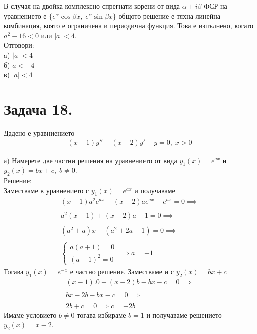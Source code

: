 \documentclass[a4paper, 12pt, oneside]{article}
\begin{document}
В случая на двойка комплексно спрегнати корени от вида $\alpha \pm i \beta$
ФСР на уравнението е $\{e^\alpha\cos \beta x, \; e^\alpha\sin \beta x\}$ общото решение
е тяхна линейна комбинация, която е ограничена и периодична функция.
Това е изпълнено, когато $a^2 - 16 < 0$ или $|a| < 4$. \\

Отговори: \\

a) $|a| < 4$ \\

б) $a < -4$ \\

в) $|a| < 4$

\section{Задача 18.}
Дадено е уравниението
\begin{align*}
    (x - 1)y'' + (x - 2)y' - y = 0, \; x > 0
\end{align*}

а) Намерете две частни решения на уравнението от вида $y_1(x) = e^{ax}$
и $y_2(x) = bx + c, \; b \neq 0$. \\

Решение: \\

Заместваме в уравнението с $y_1(x) = e^{ax}$ и получаваме
\begin{align*}
    (x - 1)a^2e^{ax} + (x - 2)ae^{ax} - e^{ax} = 0 \implies \\\\
   a^2(x - 1) + (x - 2)a - 1 = 0 \implies \\\\
   (a^2 + a)x - (a^2 + 2a + 1) = 0 \implies \\\\
    \begin{cases}
        a(a + 1) = 0 \\
        (a + 1)^2 = 0
    \end{cases} \implies a = -1
\end{align*}
Тогава $y_1(x) = e^{-x}$ е частно решение. Заместваме и с $y_2(x) = bx + c$
\begin{align*}
    (x - 1).0 + (x - 2)b - bx - c = 0 \implies \\\\
    bx -2b -bx - c = 0 \implies \\\\
    2b + c = 0 \implies c = -2b
\end{align*}
Имаме условието $b \neq 0$ тогава избираме $b = 1$
и получаваме решението \\
$y_2(x) = x - 2$. \\
\end{document}
